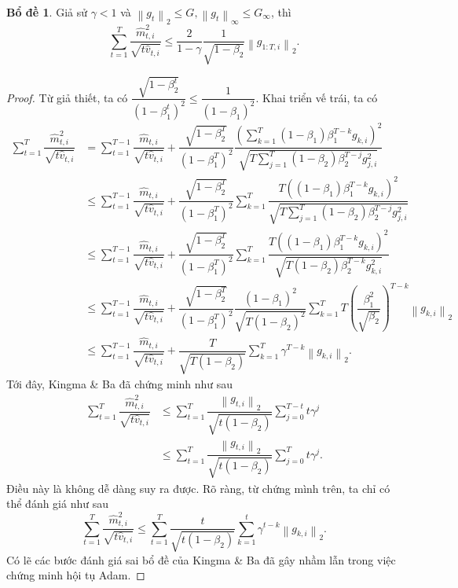\documentclass[11pt,oneside,a4paper]{report}
\theoremstyle{definition}
\newtheorem{bd}{Bổ đề}[section]
\begin{document}
\begin{bd} Giả sử $\gamma<1$ và $\left\|g_t\right\|_2 \leq G,\left\|g_t\right\|_{\infty} \leq G_{\infty}$, thì
$$
\sum_{t=1}^T \dfrac{\hat{m}_{t, i}^2}{\sqrt{t \hat{v}_{t, i}}} \leq \dfrac{2}{1-\gamma} \dfrac{1}{\sqrt{1-\beta_2}}\left\|g_{1: T, i}\right\|_2.
$$
\begin{proof}
Từ giả thiết, ta có $\dfrac{\sqrt{1-\beta_2^t}}{\left(1-\beta_1^t\right)^2} \leq \dfrac{1}{\left(1-\beta_1\right)^2}$. Khai triển vế trái, ta có
$$
\begin{aligned}
\sum_{t=1}^T \dfrac{\hat{m}_{t, i}^2}{\sqrt{t \hat{v}_{t, i}}} &=\sum_{t=1}^{T-1} \dfrac{\hat{m}_{t, i}}{\sqrt{t \hat{v}_{t, i}}}+\dfrac{\sqrt{1-\beta_2^T}}{\left(1-\beta_1^T\right)^2} \dfrac{\left(\sum_{k=1}^T\left(1-\beta_1\right) \beta_1^{T-k} g_{k, i}\right)^2}{\sqrt{T \sum_{j=1}^T\left(1-\beta_2\right) \beta_2^{T-j} g_{j, i}^2}} \\
& \leq \sum_{t=1}^{T-1} \dfrac{\hat{m}_{t, i}}{\sqrt{t \hat{v}_{t, i}}}+\dfrac{\sqrt{1-\beta_2^T}}{\left(1-\beta_1^T\right)^2} \sum_{k=1}^T \dfrac{T\left(\left(1-\beta_1\right) \beta_1^{T-k} g_{k, i}\right)^2}{\sqrt{T \sum_{j=1}^T\left(1-\beta_2\right) \beta_2^{T-j} g_{j, i}^2}} \\
& \leq \sum_{t=1}^{T-1} \dfrac{\hat{m}_{t, i}}{\sqrt{t \hat{v}_{t, i}}}+\dfrac{\sqrt{1-\beta_2^T}}{\left(1-\beta_1^T\right)^2} \sum_{k=1}^T \dfrac{T\left(\left(1-\beta_1\right) \beta_1^{T-k} g_{k, i}\right)^2}{\sqrt{T\left(1-\beta_2\right) \beta_2^{T-k} g_{k, i}^2}} \\
& \leq \sum_{t=1}^{T-1} \dfrac{\hat{m}_{t, i}}{\sqrt{t \hat{v}_{t, i}}}+\dfrac{\sqrt{1-\beta_2^T}}{\left(1-\beta_1^T\right)^2} \dfrac{\left(1-\beta_1\right)^2}{\sqrt{T\left(1-\beta_2\right)^2}} \sum_{k=1}^T T\left(\dfrac{\beta_1^2}{\sqrt{\beta_2}}\right)^{T-k}\left\|g_{k, i}\right\|_2 \\
& \leq \sum_{t=1}^{T-1} \dfrac{\hat{m}_{t, i}}{\sqrt{t \hat{v}_{t, i}}}+\dfrac{T}{\sqrt{T\left(1-\beta_2\right)}} \sum_{k=1}^T \gamma^{T-k}\left\|g_{k, i}\right\|_2.
\end{aligned}
$$
Tới đây, Kingma \& Ba đã chứng minh như sau
$$
\begin{aligned}
\sum_{t=1}^T \dfrac{\hat{m}_{t, i}^2}{\sqrt{t \hat{v}_{t, i}}} & \leq \sum_{t=1}^T \dfrac{\left\|g_{t, i}\right\|_2}{\sqrt{t\left(1-\beta_2\right)}} \sum_{j=0}^{T-t} t \gamma^j \\
& \leq \sum_{t=1}^T \dfrac{\left\|g_{t, i}\right\|_2}{\sqrt{t\left(1-\beta_2\right)}} \sum_{j=0}^T t \gamma^j.
\end{aligned}
$$
Điều này là không dễ dàng suy ra được. Rõ ràng, từ chứng mình trên, ta chỉ có thể đánh giá như sau
$$
\sum_{t=1}^T \dfrac{\hat{m}_{t, i}^2}{\sqrt{t \hat{v}_{t, i}}} \leq \sum_{t=1}^T \dfrac{t}{\sqrt{t\left(1-\beta_2\right)}} \sum_{k=1}^t \gamma^{t-k}\left\|g_{k, i}\right\|_2.
$$
Có lẽ các bước đánh giá sai bổ đề của Kingma \& Ba đã gây nhầm lẫn trong việc chứng minh hội tụ Adam.
\end{proof}
\end{bd}
\end{document}
